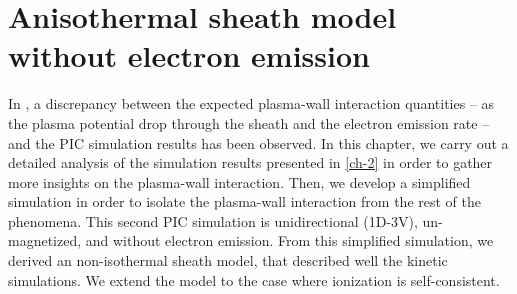 



\chapter{Anisothermal sheath model without electron emission}
\label{ch-3}



\begin{Chabstract}
  
  In , a discrepancy between the expected plasma-wall interaction quantities -- as the plasma potential drop through the sheath and the electron emission rate -- and the \ac{PIC} simulation results has been observed.
  In this chapter, we carry out a detailed analysis of the simulation results presented in \cref{ch-2}  in order to gather more insights on the plasma-wall interaction.
  Then, we develop a simplified simulation in order to isolate the plasma-wall interaction from the rest of the phenomena.
  This second \ac{PIC} simulation is unidirectional (\acs{1D}-\acs{3V}), un-magnetized, and without electron emission.
  From this simplified simulation, we derived an non-isothermal sheath model, that described well the kinetic simulations.
  We extend the model to the case where ionization is self-consistent.

\end{Chabstract}

% 
% 
% 
% 
% 


\minitoc













